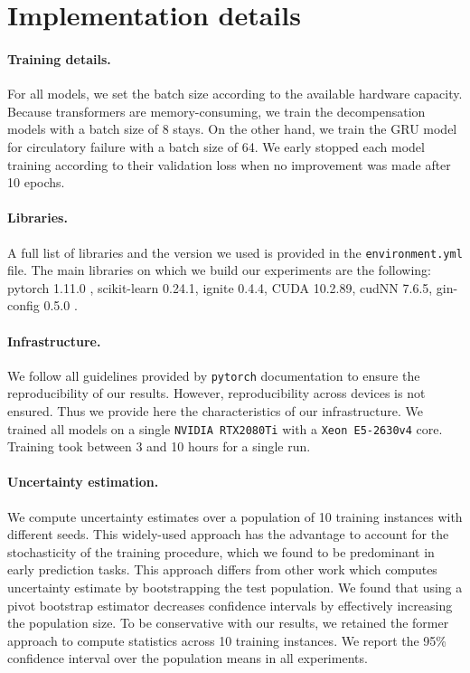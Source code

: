 \documentclass[nohyperref]{article}
\begin{document}
\section{Implementation details}
\label{appendix:implementation_details}

\paragraph{Training details.} For all models, we set the batch size according to the available hardware capacity. Because transformers are memory-consuming, we train the {decompensation} models with a batch size of 8 stays. On the other hand, we train the GRU model for {circulatory failure} with a batch size of 64. We early stopped each model training according to their validation loss when no improvement was made after 10 epochs. 

\paragraph{Libraries.} A full list of libraries and the version we used is provided in the \texttt{environment.yml} file. The main libraries on which we build our experiments are the following: pytorch 1.11.0 \citep{NEURIPS2019_9015}, scikit-learn 0.24.1\citep{scikit-learn}, ignite 0.4.4, CUDA 10.2.89\citep{cuda}, cudNN 7.6.5\citep{chetlur2014cudnn}, gin-config 0.5.0 \citep{gin}.

\paragraph{Infrastructure.}
We follow all guidelines provided by \texttt{pytorch} documentation to ensure the reproducibility of our results. However, reproducibility across devices is not ensured. Thus we provide here the characteristics of our infrastructure. We trained all models on a single \texttt{NVIDIA RTX2080Ti} with a \texttt{Xeon E5-2630v4} core. Training took between 3 and 10 hours for a single run.

\paragraph{Uncertainty estimation.} We compute uncertainty estimates over a population of 10 training instances with different seeds. This widely-used approach has the advantage to account for the stochasticity of the training procedure, which we found to be predominant in early prediction tasks. This approach differs from other work \citep{roy2021multitask,roy2022disability,tomavsev2019,tomavsev2021} which computes uncertainty estimate by bootstrapping the test population. We found that using a pivot bootstrap estimator decreases confidence intervals by effectively increasing the population size. To be conservative with our results, we retained the former approach to compute statistics across 10 training instances. We report the 95\% confidence interval over the population means in all experiments. 
\end{document}
